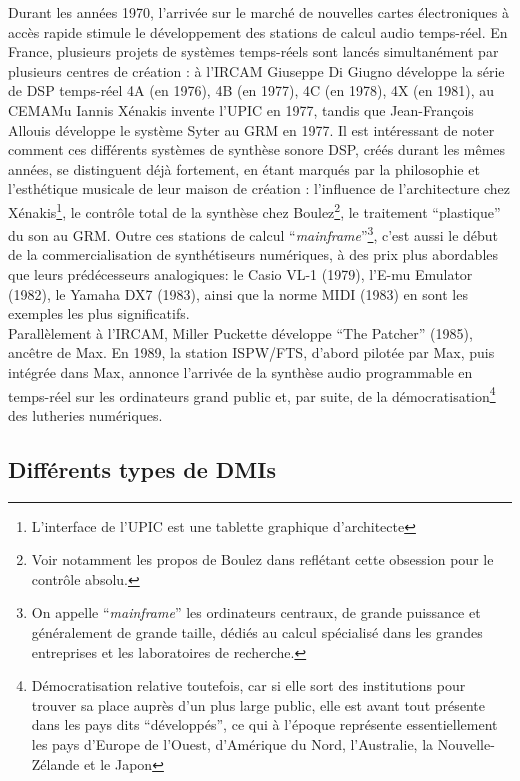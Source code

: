 \indent Durant les années 1970, l'arrivée sur le marché de nouvelles cartes électroniques à accès rapide stimule le développement des stations de calcul audio temps-réel. En France, plusieurs projets de systèmes temps-réels sont lancés simultanément par plusieurs centres de création : à l'\gls{IRCAM} Giuseppe Di Giugno développe la série de \gls{DSP} temps-réel 4A (en 1976), 4B (en 1977), 4C (en 1978), 4X (en 1981), au \gls{CEMAMu} Iannis Xénakis invente l'\gls{UPIC} en 1977, tandis que Jean-François Allouis développe le système Syter \cite{teruggi_technology_2007} au \gls{GRM} en 1977. Il est intéressant de noter comment ces différents systèmes de synthèse sonore \gls{DSP}, créés durant les mêmes années, se distinguent déjà fortement, en étant marqués par la philosophie et l'esthétique musicale de leur maison de création : l'influence de l'architecture chez Xénakis\footnote{L'interface de l'\gls{UPIC} est une tablette graphique d'architecte}, le contrôle total de la synthèse chez Boulez\footnote{Voir notamment les propos de Boulez dans \cite{albera_pli_2017} reflétant cette obsession pour le contrôle absolu.}, le traitement ``plastique'' du son au \gls{GRM}. Outre ces stations de calcul ``\textit{mainframe}''\footnote{On appelle ``\textit{mainframe}'' les ordinateurs centraux, de grande puissance et généralement de grande taille, dédiés au calcul spécialisé dans les grandes entreprises et les laboratoires de recherche.}, c'est aussi le début de la commercialisation de synthétiseurs numériques, à des prix plus abordables que leurs prédécesseurs analogiques: le Casio VL-1 (1979), l'E-mu Emulator (1982), le Yamaha DX7 (1983), ainsi que la norme \gls{MIDI} (1983) en sont les exemples les plus significatifs.\\
\indent Parallèlement à l'\gls{IRCAM}, Miller Puckette développe ``The Patcher'' (1985), ancêtre de Max. En 1989, la station \gls{ISPW}/\gls{FTS}, d'abord pilotée par Max, puis intégrée dans Max, annonce l'arrivée de la synthèse audio programmable en temps-réel sur les ordinateurs grand public et, par suite, de la démocratisation\footnote{Démocratisation relative toutefois, car si elle sort des institutions pour trouver sa place auprès d'un plus large public, elle est avant tout présente dans les pays dits ``développés'', ce qui à l'époque représente essentiellement les pays d'Europe de l'Ouest, d'Amérique du Nord, l'Australie, la Nouvelle-Zélande et le Japon} des lutheries numériques.


\subsection{Différents types de DMIs}

